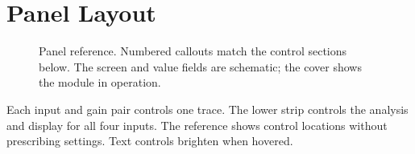 \section{Panel Layout}\label{sec:panel}

\begin{figure}[!htp]
\centering
\resizebox{\textwidth}{!}{}
\caption{Panel reference. Numbered callouts match the control sections
below. The screen and value fields are schematic; the cover shows the module
in operation.}
\end{figure}

Each input and gain pair controls one trace. The lower strip controls the
analysis and display for all four inputs. The reference shows control
locations without prescribing settings. Text controls brighten when hovered.


